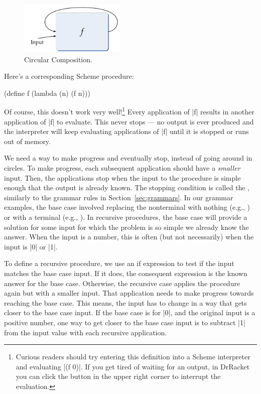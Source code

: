 \begin{schemeregion}
\begin{figure}[!hbt]
\begin{center}
\includegraphics[height=1.0in]{figures/circularcomposition.pdf} 
\caption{Circular Composition.\label{fig:circular}}
\end{center}
\end{figure}

Here's a corresponding Scheme procedure:
\begin{schemedisplay}
(define f (lambda (n) (f n)))
\end{schemedisplay}
Of course, this doesn't work very well!\footnote{Curious readers should try entering this definition into a Scheme interpreter and evaluating \scheme|(f 0)|.  If you get tired of waiting for an output, in DrRacket you can click the  button in the upper right corner to interrupt the evaluation.}  Every application of \scheme|f| results in another application of \scheme|f| to evaluate.  This never stops --- no output is ever produced and the interpreter will keep evaluating applications of \scheme|f| until it is stopped or runs out of memory.

We need a way to make progress and eventually stop, instead of going around in circles.  To make progress, each subsequent application should have a \emph{smaller} input.  Then, the applications stop when the input to the procedure is simple enough that the output is already known.  The stopping condition is called the , similarly to the grammar rules in Section~\ref{sec:grammars}.  In our grammar examples, the base case involved replacing the nonterminal with nothing (e.g., ) or with a terminal (e.g., ).  In recursive procedures, the base case will provide a solution for some input for which the problem is so simple we already know the answer.  When the input is a number, this is often (but not necessarily) when the input is \scheme|0| or \scheme|1|.

To define a recursive procedure, we use an if expression to test if the input matches the base case input.  If it does, the consequent expression is the known answer for the base case.  Otherwise, the recursive case applies the procedure again but with a smaller input.  That application needs to make progress towards reaching the base case.  This means, the input has to change in a way that gets closer to the base case input.  If the base case is for \scheme|0|, and the original input is a positive number, one way to get closer to the base case input is to subtract \scheme|1| from the input value with each recursive application.


\end{schemeregion}
